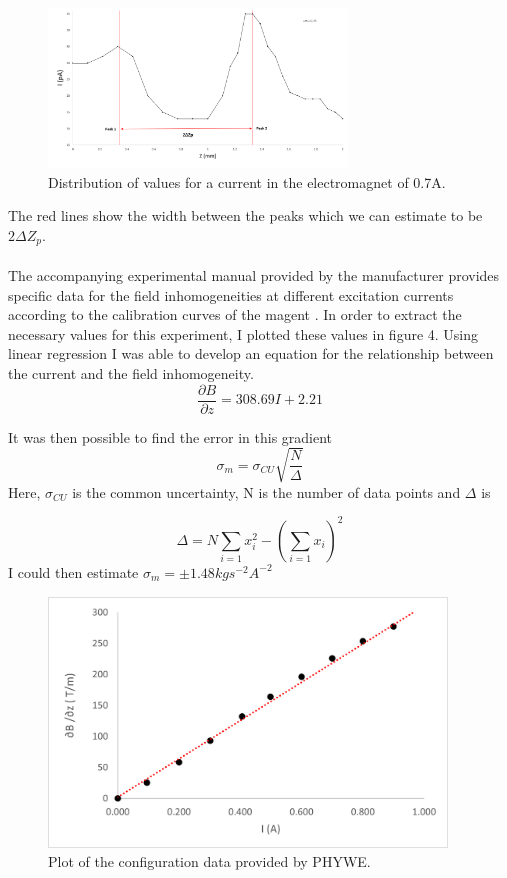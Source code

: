 \documentclass{article}%
\begin{document}
\begin{figure}[H]%
    \centering%
    \includegraphics[width=300px]{graph_3.png}%
    \caption{Distribution of values for a current in the electromagnet of 0.7A.}%
\end{figure}
The red lines show the width between the peaks which we can estimate to be $2\Delta Z_p$.
\paragraph{}
The accompanying experimental manual provided by the manufacturer provides specific data for the field inhomogeneities at different excitation currents according to the calibration curves of the magent \cite{PHYWE}. 
In order to extract the necessary values for this experiment, I plotted these values in figure 4. Using linear regression I was able to develop an equation for the relationship between the current and the field inhomogeneity.
\begin{equation}
    \frac{\partial B}{\partial z} = 308.69 I + 2.21 
\end{equation}

It was then possible to find the error in this gradient
\begin{equation}
    \sigma_m = \sigma_{CU} \sqrt{\frac{N}{\Delta}}    
\end{equation}
Here, $\sigma_{CU}$ is the common uncertainty, N is the number of data points and $\Delta$ is 

$$
\Delta = N \sum_{i=1}x_i^2 - (\sum_{i=1}x_i)^2
$$
I could then estimate $\sigma_m = \pm 1.48 kgs^{-2}A^{-2}$
\begin{figure}[H]%
    \centering%
    \includegraphics[width=400px]{graph_2.png}%
    \caption{Plot of the configuration data provided by PHYWE.}%
\end{figure}
\end{document}
